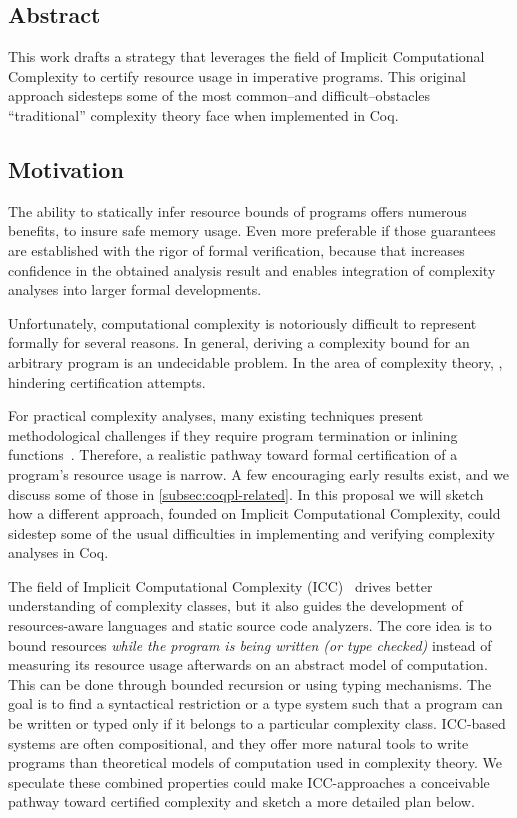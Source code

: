 
\subsection*{Abstract}

This work drafts a strategy that leverages the field of Implicit Computational Complexity to certify resource usage in imperative programs.
This original approach sidesteps some of the most common--and difficult--obstacles \enquote{traditional} complexity theory face when implemented in Coq.

\subsection{Motivation}
\label{subsec:coqpl-motivation}

The ability to statically infer resource bounds of programs offers numerous benefits, \eg to insure safe memory usage.
Even more preferable if those guarantees are established with the rigor of formal verification,
because that increases confidence in the obtained analysis result and enables integration of complexity
analyses into larger formal developments.

Unfortunately, computational complexity is notoriously difficult to represent formally for several reasons.
In general, deriving a complexity bound for an arbitrary program is an undecidable problem.
In the area of complexity theory, , hindering certification attempts.

For practical complexity analyses, many existing techniques present methodological challenges if they require
\eg program termination or inlining functions~\cite{carbonneaux2015}.
Therefore, a realistic pathway toward formal certification of a program's resource usage is narrow.
A few encouraging early results exist, and we discuss some of those in \autoref{subsec:coqpl-related}.
In this proposal we will sketch how a different approach, founded on Implicit Computational Complexity,
could sidestep some of the usual difficulties in implementing and verifying complexity analyses in Coq.

The field of Implicit Computational Complexity (ICC)~\cite{dallago2011} drives better understanding of complexity classes, but it also guides the development of resources-aware languages and static source code analyzers.
The core idea is to bound resources \emph{while the program is being written (or type checked)} instead of measuring its resource usage afterwards on an abstract model of computation.
This can be done through \eg bounded recursion or using typing mechanisms.
The goal is to find a syntactical restriction or a type system such that a program can be written or typed only if it belongs to a particular complexity class.
ICC-based systems are often compositional, and they offer more natural tools to write programs than theoretical models of computation used in complexity theory.
We speculate these combined properties could make ICC-approaches a conceivable pathway toward certified complexity and sketch a more detailed plan below.

